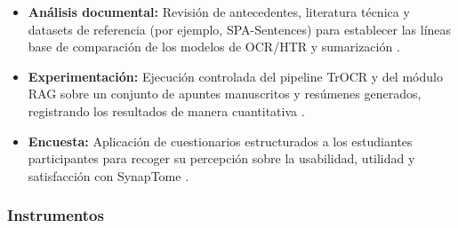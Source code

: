 \begin{itemize}
  \item \textbf{Análisis documental:} Revisión de antecedentes, literatura técnica y datasets de referencia (por ejemplo, SPA-Sentences) para establecer las líneas base de comparación de los modelos de OCR/HTR y sumarización \parencite{TarazonaCruz2024}.
  \item \textbf{Experimentación:} Ejecución controlada del pipeline TrOCR y del módulo RAG sobre un conjunto de apuntes manuscritos y resúmenes generados, registrando los resultados de manera cuantitativa \parencite{AlHitawi2026}.
  \item \textbf{Encuesta:} Aplicación de cuestionarios estructurados a los estudiantes participantes para recoger su percepción sobre la usabilidad, utilidad y satisfacción con SynapTome \parencite{Afian2025, Dano2026}.
\end{itemize}

\subsubsection{Instrumentos}

